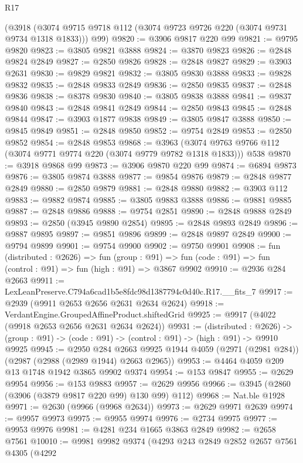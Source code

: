 \begin{lexlean}{R17}
\begin{coremodule}
    (@3918 (@3074 @9715 @9718 @112 (@3074 @9723 @9726 @220 (@3074 @9731 @9734 @1318 @1833))) @99)
@9820 := @3906 @9817 @220 @99
@9821 := @9795 @9820
@9823 := @3805 @9821 @3888
@9824 := @3870 @9823
@9826 := @2848 @9824 @2849
@9827 := @2850 @9826
@9828 := @2848 @9827
@9829 := @3903 @2631
@9830 := @9829 @9821
@9832 := @3805 @9830 @3888
@9833 := @9828 @9832
@9835 := @2848 @9833 @2849
@9836 := @2850 @9835
@9837 := @2848 @9836
@9838 := @8378 @9830
@9840 := @3805 @9838 @3888
@9841 := @9837 @9840
@9843 := @2848 @9841 @2849
@9844 := @2850 @9843
@9845 := @2848 @9844
@9847 := @3903 @1877 @9838
@9849 := @3805 @9847 @3888
@9850 := @9845 @9849
@9851 := @2848 @9850
@9852 := @9754 @2849
@9853 := @2850 @9852
@9854 := @2848 @9853
@9868 := @3963
    (@3074 @9763 @9766 @112 (@3074 @9771 @9774 @220 (@3074 @9779 @9782 @1318 @1833)))
    @538
@9870 := @3918 @9868 @99
@9873 := @3906 @9870 @220 @99
@9874 := @6894 @9873
@9876 := @3805 @9874 @3888
@9877 := @9854 @9876
@9879 := @2848 @9877 @2849
@9880 := @2850 @9879
@9881 := @2848 @9880
@9882 := @3903 @112
@9883 := @9882 @9874
@9885 := @3805 @9883 @3888
@9886 := @9881 @9885
@9887 := @2848 @9886
@9888 := @9754 @2851
@9890 := @2848 @9888 @2849
@9893 := @2850 (@3945 @9890 @2854)
@9895 := @2848 @9893 @2849
@9896 := @9887 @9895
@9897 := @9851 @9896
@9899 := @2848 @9897 @2849
@9900 := @9794 @9899
@9901 := @9754 @9900
@9902 := @9750 @9901
@9908 := fun (distributed : @2626) =>
  fun (group : @91) => fun (code : @91) => fun (control : @91) => fun (high : @91) => @3867 @9902
@9910 := @2936 @284 @2663
@9911 := LexLeanPreserve.C794a6cad1b5e8fdc98d1387794c0d40c.R17.__fits_7
@9917 := @2939 (@9911 @2653 @2656 @2631 @2634 @2624)
@9918 := VerdantEngine.GroupedAffineProduct.shiftedGrid
@9925 := @9917 (@4022 (@9918 @2653 @2656 @2631 @2634 @2624))
@9931 := (distributed : @2626) ->
  (group : @91) -> (code : @91) -> (control : @91) -> (high : @91) -> @9910 @9925
@9945 := @2950
    @284
    @2663
    @9925
    @1944
    @4059
    (@2971 (@2981 @284))
    (@2987 (@2988 (@2989 @1944) @2663 @2965))
@9953 := @4464 @4059 @209 @13 @1748 @1942 @3865 @9902 @9374
@9954 := @153 @9847
@9955 := @2629 @9954
@9956 := @153 @9883
@9957 := @2629 @9956
@9966 := @3945 (@2860 (@3906 (@3879 @9817 @220 @99) @130 @99) @112)
@9968 := Nat.ble @1928
@9971 := @2630 (@9966 (@9968 @2634))
@9973 := @2629 @9971 @2639
@9974 := @9957 @9973
@9975 := @9955 @9974
@9976 := @2734 @9975
@9977 := @9953 @9976
@9981 := @4281 @234 @1665 @3863 @2849
@9982 := @2658 @7561
@10010 := @9981
    @9982
    @9374
    (@4293
      @243
      @2849
      @2852
      @2657
      @7561
      @4305
      (@4292

\end{coremodule}
\end{lexlean}
